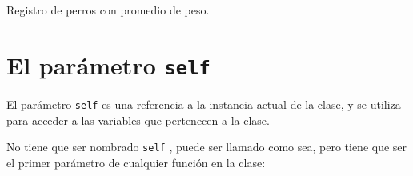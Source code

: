 \begin{code}
Registro de perros con promedio de peso.

\begin{Shaded}
\begin{Highlighting}[]
\OperatorTok{=} 

     \NormalTok{(}
        \OperatorTok{=}


\OperatorTok{=}\NormalTok{)}
\NormalTok{(}\SpecialCharTok{\{}\SpecialCharTok{\}}\NormalTok{)}
\NormalTok{(}\SpecialCharTok{\{}\SpecialCharTok{\}}\NormalTok{)}

\end{Highlighting}
\end{Shaded}
\end{code}

\section{\texorpdfstring{El parámetro \texttt{self}}{El parámetro self}}

El parámetro \texttt{self} es una referencia a la instancia actual de la
clase, y se utiliza para acceder a las variables que pertenecen a la
clase.

No tiene que ser nombrado \texttt{self} , puede ser llamado como sea,
pero tiene que ser el primer parámetro de cualquier función en la clase:

